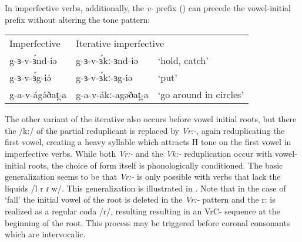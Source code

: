 In imperfective verbs, additionally, the \textit{v-} prefix () can precede the vowel-initial prefix without altering the tone pattern:

\ea \begin{tabular}[t]{lll}
Imperfective	&	\multicolumn{2}{l}{Iterative imperfective}\\
g-ɜ-v-ɜ́nd-iə		&	g-ɜ-v-ɜ́kː-ɜnd-iə	&	‘hold, catch’\\ 
g-ɜ-v-ɜ́g-iə́ 		&	g-ɜ-v-ɜ́kː-ɜg-iə		&	‘put’\\
g-a-v-ágə́ðat̪-a	&	g-a-v-ákː-agəðat̪-a	&	‘go around
				in circles’\\ 	
\end{tabular}
\z 

The other variant of the iterative also occurs before vowel initial roots, but there the /k:/ of the partial reduplicant is replaced by \textit{Vr:-}, again reduplicating the first vowel, creating a heavy syllable which attracts H tone on the first vowel in imperfective verbs. While both  \textit{Vr:-} and the \textit{Vk:-} reduplication occur with vowel-initial roots, the choice of form itself is phonologically conditioned. The basic generalization seems to be that \textit{Vr:-} is only possible with verbs that lack the liquids /l r ɾ w/. This generalization is illustrated in . Note that in the case of `fall' the initial vowel of the root is deleted in the \textit{Vr:-} pattern and the r: is realized as a regular coda /r/, resulting resulting in an VrC- sequence at the beginning of the root. This process may be triggered before coronal consonants which are intervocalic.

